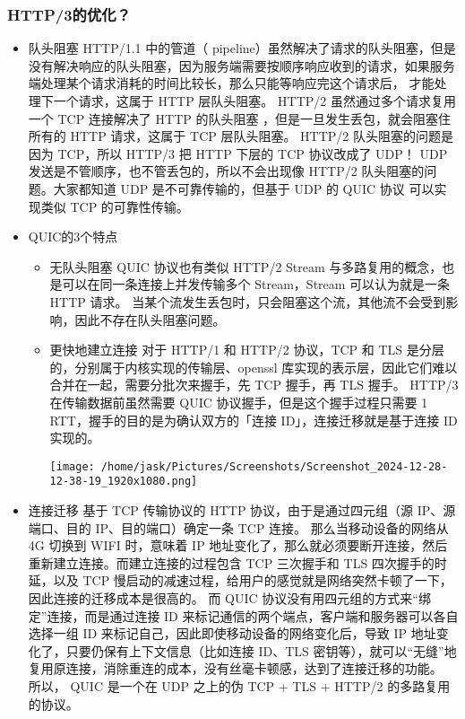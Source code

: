 \documentclass[11pt]{article}
\begin{document}
\subsubsection{HTTP/3的优化？}
\label{sec:orgdc6bce6}
\begin{itemize}
\item 队头阻塞
HTTP/1.1 中的管道（ pipeline）虽然解决了请求的队头阻塞，但是没有解决响应的队头阻塞，因为服务端需要按顺序响应收到的请求，如果服务端处理某个请求消耗的时间比较长，那么只能等响应完这个请求后， 才能处理下一个请求，这属于 HTTP 层队头阻塞。
HTTP/2 虽然通过多个请求复用一个 TCP 连接解决了 HTTP 的队头阻塞 ，但是一旦发生丢包，就会阻塞住所有的 HTTP 请求，这属于 TCP 层队头阻塞。
HTTP/2 队头阻塞的问题是因为 TCP，所以 HTTP/3 把 HTTP 下层的 TCP 协议改成了 UDP！
UDP 发送是不管顺序，也不管丢包的，所以不会出现像 HTTP/2 队头阻塞的问题。大家都知道 UDP 是不可靠传输的，但基于 UDP 的 QUIC 协议 可以实现类似 TCP 的可靠性传输。
\item QUIC的3个特点
\begin{itemize}
\item 无队头阻塞
QUIC 协议也有类似 HTTP/2 Stream 与多路复用的概念，也是可以在同一条连接上并发传输多个 Stream，Stream 可以认为就是一条 HTTP 请求。
当某个流发生丢包时，只会阻塞这个流，其他流不会受到影响，因此不存在队头阻塞问题。
\item 更快地建立连接
对于 HTTP/1 和 HTTP/2 协议，TCP 和 TLS 是分层的，分别属于内核实现的传输层、openssl 库实现的表示层，因此它们难以合并在一起，需要分批次来握手，先 TCP 握手，再 TLS 握手。
HTTP/3 在传输数据前虽然需要 QUIC 协议握手，但是这个握手过程只需要 1 RTT，握手的目的是为确认双方的「连接 ID」，连接迁移就是基于连接 ID 实现的。
\begin{center}
\texttt{[image: /home/jask/Pictures/Screenshots/Screenshot\_2024-12-28-12-38-19\_1920x1080.png]}
\end{center}
\end{itemize}
\item 连接迁移
基于 TCP 传输协议的 HTTP 协议，由于是通过四元组（源 IP、源端口、目的 IP、目的端口）确定一条 TCP 连接。
那么当移动设备的网络从 4G 切换到 WIFI 时，意味着 IP 地址变化了，那么就必须要断开连接，然后重新建立连接。而建立连接的过程包含 TCP 三次握手和 TLS 四次握手的时延，以及 TCP 慢启动的减速过程，给用户的感觉就是网络突然卡顿了一下，因此连接的迁移成本是很高的。
而 QUIC 协议没有用四元组的方式来“绑定”连接，而是通过连接 ID 来标记通信的两个端点，客户端和服务器可以各自选择一组 ID 来标记自己，因此即使移动设备的网络变化后，导致 IP 地址变化了，只要仍保有上下文信息（比如连接 ID、TLS 密钥等），就可以“无缝”地复用原连接，消除重连的成本，没有丝毫卡顿感，达到了连接迁移的功能。
所以， QUIC 是一个在 UDP 之上的伪 TCP + TLS + HTTP/2 的多路复用的协议。
\end{itemize}
\end{document}
